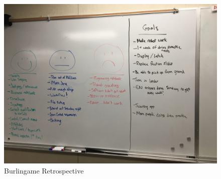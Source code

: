 \documentclass{article}
\begin{document}
\begin{figure}
    \centering
    \includegraphics[width=.6 \textwidth]{12_11-19/images/retrospective.JPG}
    \caption{Burlingame Retrospective}
    \label{fig:retrospective}
\end{figure}
\end{document}
